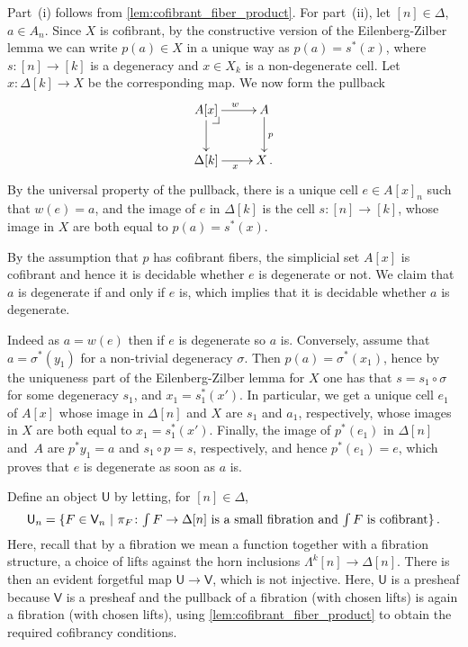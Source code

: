 \documentclass[reqno,10pt,a4paper,oneside]{amsart}
\makeatletter
\renewenvironment{proof}[1][\proofname] {\par\pushQED{\qed}\normalfont\topsep6\p@\@plus6\p@\relax\trivlist\item[\hskip\labelsep\bf#1\@addpunct{.}]\ignorespaces}{\popQED\endtrivlist\@endpefalse}
\numberwithin{equation}{section}
\theoremstyle{mythm}
\theoremstyle{mydef}
\theoremstyle{myrmk}
\newcommand{\pullback}[1]{\save*!/#1-1.2pc/#1:(-1,1)@^{|-}\restore}
\newcommand{\drpullback}{\pullback{dr}}
\newcommand{\ie}{\text{i.e.\ }}
\newcommand{\co}{\colon}
\newcommand{\U}{\mathsf{U}}
\newcommand{\V}{\mathsf{V}}
\makeatother
\begin{document}
\begin{proof} Part~(i) follows from \cref{lem:cofibrant_fiber_product}. For part~(ii), let $[n] \in \Delta$, $a \in A_n$. Since $X$ is cofibrant, by the constructive version of the Eilenberg-Zilber lemma we can write $p(a) \in X$ in a unique way as $p(a) =s^*(x)$, where $s \co [n] \to [k]$ is a degeneracy and 
$x \in X_k$ is a non-degenerate cell. Let $x \co \Delta[k] \rightarrow X$ be the corresponding map. We now form the pullback
\[
\xymatrix{
A[x] \ar[r]^w \ar[d] \drpullback & A  \ar[d]^{p}  \\
\Delta[k] \ar[r]_{x} & X \, . }
\]
By the universal property of the pullback, there is a unique cell $e \in A[x]_n$ such that $w(e)=a$, and the image of $e$ in $\Delta[k]$ is the cell $s \co [n] \to [k]$, whose image in $X$ are both equal to $p(a)=s^*(x)$.

By the assumption that $p$ has cofibrant fibers, the simplicial set $A[x]$ is cofibrant and hence it is decidable whether $e$ is degenerate or not. We claim that $a$ is degenerate if and only if $e$ is, which implies that it is decidable whether $a$ is degenerate.

 Indeed as $a = w(e)$ then if $e$ is degenerate so $a$ is. Conversely, assume that $a=\sigma^*(y_1)$ for a non-trivial degeneracy $\sigma$. Then $p(a)=\sigma^*(x_1)$, hence by the uniqueness part of the Eilenberg-Zilber lemma for $X$ one has that $s=s_1 \circ \sigma$ for some degeneracy $s_1$, and $x_1 = s_1^*(x')$. In particular, we get a unique cell $e_1$ of $A[x]$ whose image in $\Delta[n]$ and $X$ are  $s_1$ and $a_1$, respectively, whose images in $X$ are both equal to $x_1=s_1^*(x')$. Finally, the image of $p^*(e_1)$ in $\Delta[n]$ and~$A$ are  $p^* y_1 =a$ and $s_1 \circ p =s$, respectively, and hence $p^*(e_1) =e$, which proves that $e$ is degenerate as soon as $a$ is.
\end{proof} 


Define an object $\U$ by letting, for $[n] \in \Delta$, 
\[
\U_n = \{ F \in \V_n \ | \ \pi_F \co \textstyle{\int F} \to \Delta[n] \text{ is a small fibration and 
$ \textstyle{\int F}$ is cofibrant} \} \, .
\]
Here, recall that by a fibration we  mean a function together with a fibration structure, \ie a choice of lifts against the horn inclusions $\Lambda^k[n] \to \Delta[n]$.
There is then an evident forgetful map $\U \to \V$, which is not injective. Here, $\U$ is a presheaf because $\V$ is a presheaf and the pullback of a fibration (with chosen lifts) is again a fibration (with chosen lifts), using \cref{lem:cofibrant_fiber_product} to obtain the required cofibrancy conditions.
\end{document}
